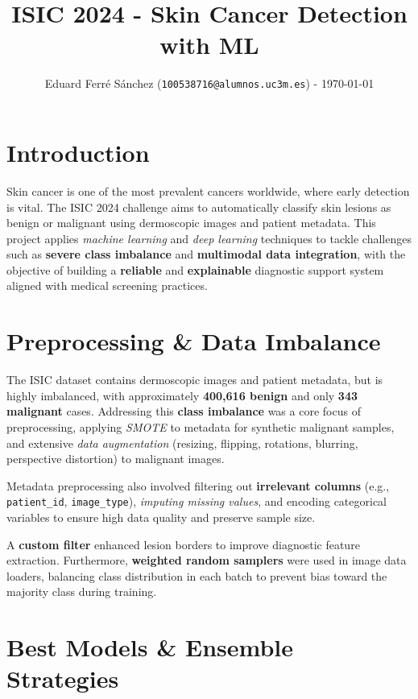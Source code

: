 \documentclass[11pt,a4paper]{article}
\title{\textbf{ISIC 2024 - Skin Cancer Detection with ML}}
\author{Eduard Ferré Sánchez (\texttt{100538716@alumnos.uc3m.es}) - \today}
\date{}
\begin{document}
\maketitle

\section{Introduction}

Skin cancer is one of the most prevalent cancers worldwide, where early detection is vital. The ISIC 2024 challenge aims to automatically classify skin lesions as benign or malignant using dermoscopic images and patient metadata. This project applies \textit{machine learning} and \textit{deep learning} techniques to tackle challenges such as \textbf{severe class imbalance} and \textbf{multimodal data integration}, with the objective of building a \textbf{reliable} and \textbf{explainable} diagnostic support system aligned with medical screening practices.

\section{Preprocessing \& Data Imbalance}

The ISIC dataset contains dermoscopic images and patient metadata, but is highly imbalanced, with approximately \textbf{400,616 benign} and only \textbf{343 malignant} cases. Addressing this \textbf{class imbalance} was a core focus of preprocessing, applying \textit{SMOTE} to metadata for synthetic malignant samples, and extensive \textit{data augmentation} (resizing, flipping, rotations, blurring, perspective distortion) to malignant images.

Metadata preprocessing also involved filtering out \textbf{irrelevant columns} (e.g., \texttt{patient\_id}, \texttt{image\_type}), \textit{imputing missing values}, and encoding categorical variables to ensure high data quality and preserve sample size.

A \textbf{custom filter} enhanced lesion borders to improve diagnostic feature extraction. Furthermore, \textbf{weighted random samplers} were used in image data loaders, balancing class distribution in each batch to prevent bias toward the majority class during training.

\section{Best Models \& Ensemble Strategies}
\end{document}
